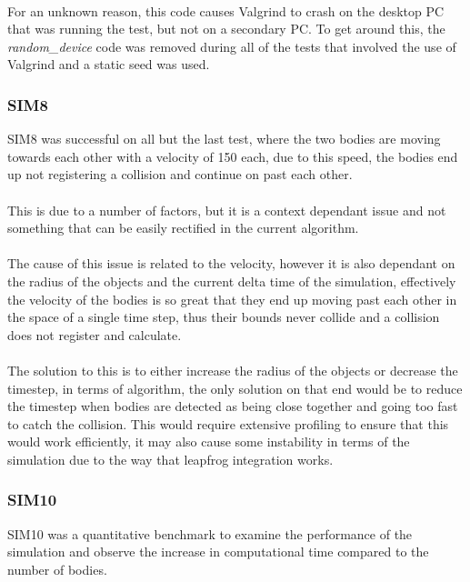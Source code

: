 \paragraph{}
For an unknown reason, this code causes Valgrind to crash on the desktop PC that was running the test, but not on a secondary PC. To get around this, the \textit{random\_device} code was removed during all of the tests that involved the use of Valgrind and a static seed was used.
\subsubsection{SIM8}
SIM8 was successful on all but the last test, where the two bodies are moving towards each other with a velocity of 150 each, due to this speed, the bodies end up not registering a collision and continue on past each other.
\paragraph{}
This is due to a number of factors, but it is a context dependant issue and not something that can be easily rectified in the current algorithm.
\paragraph{}
The cause of this issue is related to the velocity, however it is also dependant on the radius of the objects and the current delta time of the simulation, effectively the velocity of the bodies is so great that they end up moving past each other in the space of a single time step, thus their bounds never collide and a collision does not register and calculate.
\paragraph{}
The solution to this is to either increase the radius of the objects or decrease the timestep, in terms of algorithm, the only solution on that end would be to reduce the timestep when bodies are detected as being close together and going too fast to catch the collision. This would require extensive profiling to ensure that this would work efficiently, it may also cause some instability in terms of the simulation due to the way that leapfrog integration works.
\subsubsection{SIM10}
SIM10 was a quantitative benchmark to examine the performance of the simulation and observe the increase in computational time compared to the number of bodies.
